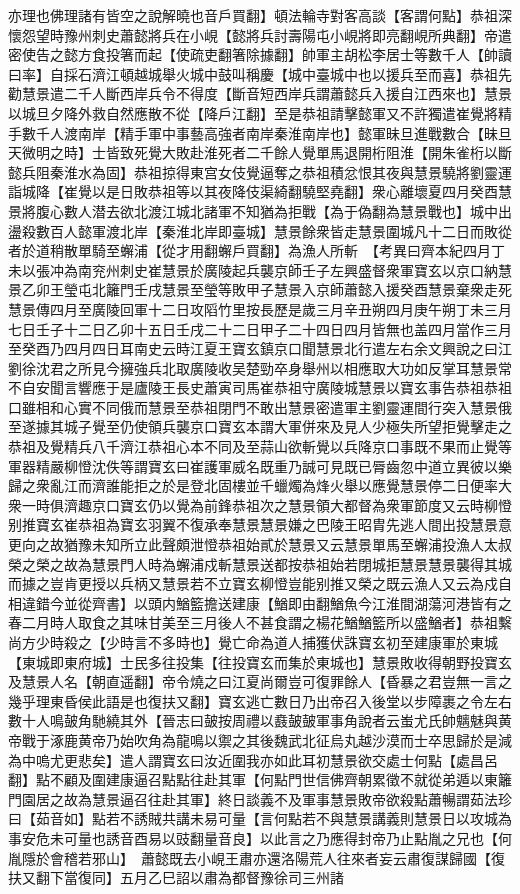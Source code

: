 亦理也佛理諸有皆空之說解曉也音戶買翻】頓法輪寺對客高談【客謂何點】恭祖深懷怨望時豫州刺史蕭懿將兵在小峴【懿將兵討壽陽屯小峴將即亮翻峴所典翻】帝遣密使告之懿方食投箸而起【使疏吏翻箸除據翻】帥軍主胡松李居士等數千人【帥讀曰率】自採石濟江頓越城舉火城中鼓叫稱慶【城中臺城中也以援兵至而喜】恭祖先勸慧景遣二千人斷西岸兵令不得度【斷音短西岸兵謂蕭懿兵入援自江西來也】慧景以城旦夕降外救自然應散不從【降戶江翻】至是恭祖請擊懿軍又不許獨遣崔覺將精手數千人渡南岸【精手軍中事藝高強者南岸秦淮南岸也】懿軍昧旦進戰數合【昧旦天微明之時】士皆致死覺大敗赴淮死者二千餘人覺單馬退開桁阻淮【開朱雀桁以斷懿兵阻秦淮水為固】恭祖掠得東宫女伎覺逼奪之恭祖積忿恨其夜與慧景驍將劉靈運詣城降【崔覺以是日敗恭祖等以其夜降伎渠綺翻驍堅堯翻】衆心離壞夏四月癸酉慧景將腹心數人潜去欲北渡江城北諸軍不知猶為拒戰【為于偽翻為慧景戰也】城中出盪殺數百人懿軍渡北岸【秦淮北岸即臺城】慧景餘衆皆走慧景圍城凡十二日而敗從者於道稍散單騎至蠏浦【從才用翻蠏戶買翻】為漁人所斬　【考異曰齊本紀四月丁未以張冲為南兖州刺史崔慧景於廣陵起兵襲京師壬子左興盛督衆軍寶玄以京口納慧景乙卯王瑩屯北籬門壬戌慧景至瑩等敗甲子慧景入京師蕭懿入援癸酉慧景棄衆走死慧景傳四月至廣陵回軍十二日攻䧟竹里按長歷是歲三月辛丑朔四月庚午朔丁未三月七日壬子十二日乙卯十五日壬戌二十二日甲子二十四日四月皆無也盖四月當作三月至癸酉乃四月四日耳南史云時江夏王寶玄鎮京口聞慧景北行遣左右余文興說之曰江劉徐沈君之所見今擁強兵北取廣陵收吴楚勁卒身舉州以相應取大功如反掌耳慧景常不自安聞言響應于是廬陵王長史蕭寅司馬崔恭祖守廣陵城慧景以寶玄事告恭祖恭祖口雖相和心實不同俄而慧景至恭祖閉門不敢出慧景密遣軍主劉靈運間行突入慧景俄至遂據其城子覺至仍使領兵襲京口寶玄本謂大軍併來及見人少極失所望拒覺擊走之恭祖及覺精兵八千濟江恭祖心本不同及至蒜山欲斬覺以兵降京口事既不果而止覺等軍器精嚴柳憕沈佚等謂寶玄曰崔護軍威名既重乃誠可見既已脣齒忽中道立異彼以樂歸之衆亂江而濟誰能拒之於是登北固樓並千蠟燭為烽火舉以應覺慧景停二日便率大衆一時俱濟趣京口寶玄仍以覺為前鋒恭祖次之慧景領大都督為衆軍節度又云時柳憕别推寶玄崔恭祖為寶玄羽翼不復承奉慧景慧景嫌之巴陵王昭胄先逃人間出投慧景意更向之故猶豫未知所立此聲頗泄憕恭祖始貳於慧景又云慧景單馬至蠏浦投漁人太叔榮之榮之故為慧景門人時為蠏浦戍斬慧景送都按恭祖始若閉城拒慧景慧景襲得其城而據之豈肯更授以兵柄又慧景若不立寶玄柳憕豈能别推又榮之既云漁人又云為戍自相違錯今並從齊書】以頭内鰌籃擔送建康【鰌即由翻鰌魚今江淮間湖蕩河港皆有之春二月時人取食之其味甘美至三月後人不甚食謂之楊花鰌鰌籃所以盛鰌者】恭祖繫尚方少時殺之【少時言不多時也】覺亡命為道人捕獲伏誅寶玄初至建康軍於東城【東城即東府城】士民多往投集【往投寶玄而集於東城也】慧景敗收得朝野投寶玄及慧景人名【朝直遥翻】帝令燒之曰江夏尚爾豈可復罪餘人【昏暴之君豈無一言之幾乎理東昏侯此語是也復扶又翻】寶玄逃亡數日乃出帝召入後堂以步障裹之令左右數十人鳴皷角馳繞其外【晉志曰皷按周禮以鼖皷皷軍事角說者云蚩尤氏帥魑魅與黄帝戰于涿鹿黄帝乃始吹角為龍鳴以禦之其後魏武北征烏丸越沙漠而士卒思歸於是減為中嗚尤更悲矣】遣人謂寶玄曰汝近圍我亦如此耳初慧景欲交處士何點【處昌呂翻】點不顧及圍建康逼召點點往赴其軍【何點門世信佛齊朝累徵不就從弟遁以東籬門園居之故為慧景逼召往赴其軍】終日談義不及軍事慧景敗帝欲殺點蕭暢謂茹法珍曰【茹音如】點若不誘賊共講未易可量【言何點若不與慧景講義則慧景日以攻城為事安危未可量也誘音酉易以豉翻量音良】以此言之乃應得封帝乃止點胤之兄也【何胤隱於會稽若邪山】　蕭懿既去小峴王肅亦還洛陽荒人往來者妄云肅復謀歸國【復扶又翻下當復同】五月乙巳詔以肅為都督豫徐司三州諸